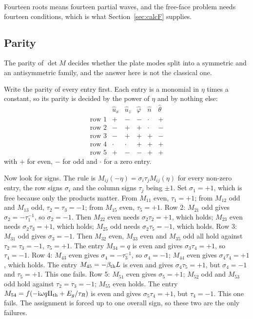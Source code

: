 \documentclass[11pt]{article}
\makeatletter
\newif\ifshowworked
\newenvironment{worked}{%
  \ifshowworked\par\smallskip\noindent\textit{Working.}\par\smallskip\else
  \setbox\z@\vbox\bgroup\fi}{\ifshowworked\par\smallskip\else\egroup\fi}
\newcommand{\ii}{\mathrm{i}}
\makeatother
\begin{document}
Fourteen roots means fourteen partial waves, and the free-face problem needs fourteen conditions, which is
what Section~\ref{sec:calcF} supplies.

\subsection*{Parity}

The parity of $\det M$ decides whether the plate modes split into a symmetric and an antisymmetric family,
and the answer here is not the classical one.

Write the parity of every entry first. Each entry is a monomial in $\eta$ times a constant, so its parity
is decided by the power of $\eta$ and by nothing else:
\begin{equation}
\begin{array}{c|ccccc}
 & \hat u_x & \hat u_z & \hat\varphi & \hat n & \hat\theta\\\hline
\text{row 1} & + & - & - & \cdot & +\\
\text{row 2} & - & + & + & \cdot & -\\
\text{row 3} & - & + & + & + & -\\
\text{row 4} & \cdot & \cdot & + & + & +\\
\text{row 5} & + & - & - & + & +
\end{array}
\label{eq:paritytable}
\end{equation}
with $+$ for even, $-$ for odd and $\cdot$ for a zero entry.

\begin{worked}
Now look for signs. The rule is $M_{ij}(-\eta)=\sigma_i\tau_jM_{ij}(\eta)$ for every non-zero entry, the
row signs $\sigma_i$ and the column signs $\tau_j$ being $\pm1$.
Set $\sigma_1=+1$, which is free because only the products matter. From $M_{11}$ even, $\tau_1=+1$; from
$M_{12}$ odd and $M_{13}$ odd, $\tau_2=\tau_3=-1$; from $M_{15}$ even, $\tau_5=+1$.
Row 2: $M_{21}$ odd gives $\sigma_2=-\tau_1^{-1}$, so $\sigma_2=-1$. Then $M_{22}$ even needs
$\sigma_2\tau_2=+1$, which holds; $M_{23}$ even needs $\sigma_2\tau_3=+1$, which holds; $M_{25}$ odd needs
$\sigma_2\tau_5=-1$, which holds.
Row 3: $M_{31}$ odd gives $\sigma_3=-1$. Then $M_{32}$ even, $M_{33}$ even and $M_{35}$ odd all hold
against $\tau_2=\tau_3=-1$, $\tau_5=+1$. The entry $M_{34}=q$ is even and gives $\sigma_3\tau_4=+1$, so
$\tau_4=-1$.
Row 4: $M_{43}$ even gives $\sigma_4=-\tau_3^{-1}$, so $\sigma_4=-1$; $M_{44}$ even gives
$\sigma_4\tau_4=+1$, which holds. The entry $M_{45}=-\beta_{\rm th}L$ is even and gives
$\sigma_4\tau_5=+1$, but $\sigma_4=-1$ and $\tau_5=+1$. This one fails.
Row 5: $M_{51}$ even gives $\sigma_5=+1$; $M_{52}$ odd and $M_{53}$ odd hold against $\tau_2=\tau_3=-1$;
$M_{55}$ even holds. The entry $M_{54}=f(-\ii\omega q\Pi_{\rm th}+E_g/\tau_R)$ is even and gives
$\sigma_5\tau_4=+1$, but $\tau_4=-1$. This one fails.
The assignment is forced up to one overall sign, so these two are the only failures.
\end{worked}
\end{document}
